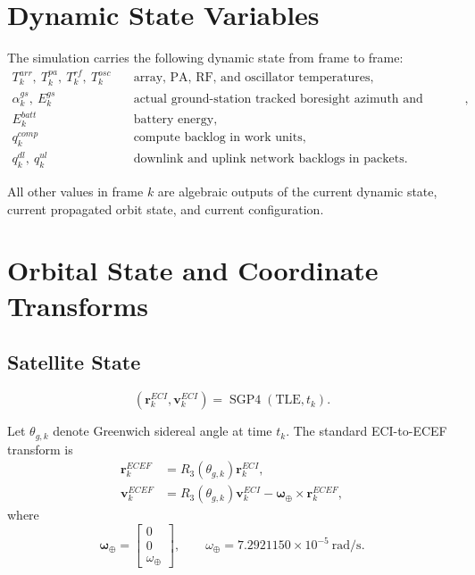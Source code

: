 \documentclass[11pt]{article}
\newcommand{\vect}[1]{\mathbf{#1}}
\begin{document}
\section{Dynamic State Variables}

The simulation carries the following dynamic state from frame to frame:
\begin{align}
  T^{arr}_k, \ T^{pa}_k, \ T^{rf}_k, \ T^{osc}_k
  & \quad \text{array, PA, RF, and oscillator temperatures}, \\
  \alpha^{gs}_k, \ E^{gs}_k
  & \quad \text{actual ground-station tracked boresight azimuth and elevation}, \\
  E^{batt}_k
  & \quad \text{battery energy}, \\
  q^{comp}_k
  & \quad \text{compute backlog in work units}, \\
  q^{dl}_k, \ q^{ul}_k
  & \quad \text{downlink and uplink network backlogs in packets}.
\end{align}

All other values in frame $k$ are algebraic outputs of the current dynamic state,
current propagated orbit state, and current configuration.

\section{Orbital State and Coordinate Transforms}

\subsection{Satellite State}

\begin{equation}
  \left( \vect{r}^{ECI}_k, \vect{v}^{ECI}_k \right)
  =
  \operatorname{SGP4}(\mathrm{TLE}, t_k).
\end{equation}

Let $\theta_{g,k}$ denote Greenwich sidereal angle at time $t_k$.
The standard ECI-to-ECEF transform is
\begin{align}
  \vect{r}^{ECEF}_k
  &= R_3(\theta_{g,k}) \vect{r}^{ECI}_k, \\
  \vect{v}^{ECEF}_k
  &= R_3(\theta_{g,k}) \vect{v}^{ECI}_k
     - \vect{\omega}_{\oplus} \times \vect{r}^{ECEF}_k,
\end{align}
where
\begin{equation}
  \vect{\omega}_{\oplus}
  =
  \begin{bmatrix}
    0 \\ 0 \\ \omega_{\oplus}
  \end{bmatrix},
  \qquad
  \omega_{\oplus} = 7.2921150 \times 10^{-5} \ \mathrm{rad/s}.
\end{equation}
\end{document}
